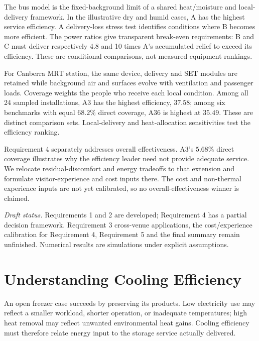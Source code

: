 \documentclass[12pt]{article}
\begin{document}
The bus model is the fixed-background limit of a shared heat/moisture and local-delivery framework. In the illustrative dry and humid cases, A has the highest service efficiency. A delivery-loss stress test identifies conditions where B becomes more efficient. The power ratios give transparent break-even requirements: B and C must deliver respectively 4.8 and 10 times A's accumulated relief to exceed its efficiency. These are conditional comparisons, not measured equipment rankings.

For Canberra MRT station, the same device, delivery and SET modules are retained while background air and surfaces evolve with ventilation and passenger loads. Coverage weights the people who receive each local condition. Among all 24 sampled installations, A3 has the highest efficiency, $37.58$; among six benchmarks with equal $68.2\%$ direct coverage, A36 is highest at $35.49$. These are distinct comparison sets. Local-delivery and heat-allocation sensitivities test the efficiency ranking.

Requirement 4 separately addresses overall effectiveness. A3's $5.68\%$ direct coverage illustrates why the efficiency leader need not provide adequate service. We relocate residual-discomfort and energy tradeoffs to that extension and formulate visitor-experience and cost inputs there. The cost and non-thermal experience inputs are not yet calibrated, so no overall-effectiveness winner is claimed.

\medskip
\noindent\textit{Draft status.} Requirements 1 and 2 are developed; Requirement 4 has a partial decision framework. Requirement 3 cross-venue applications, the cost/experience calibration for Requirement 4, Requirement 5 and the final summary remain unfinished. Numerical results are simulations under explicit assumptions.

\clearpage
\pagestyle{fancy}
\tableofcontents
\clearpage

\section{Understanding Cooling Efficiency}
\label{sec:understand}

An open freezer case succeeds by preserving its products. Low electricity use may reflect a smaller workload, shorter operation, or inadequate temperatures; high heat removal may reflect unwanted environmental heat gains. Cooling efficiency must therefore relate energy input to the storage service actually delivered.
\end{document}

